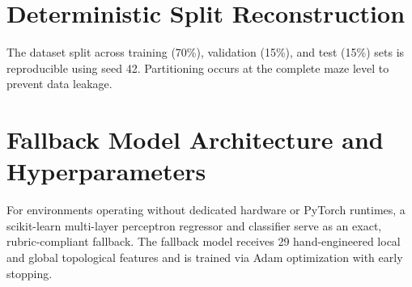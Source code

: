 
\section{Deterministic Split Reconstruction}
\label{app:split}
The dataset split across training (70\%), validation (15\%), and test (15\%) sets is
reproducible using seed 42. Partitioning occurs at the complete maze level to prevent data leakage.

\section{Fallback Model Architecture and Hyperparameters}
\label{app:fallback}
For environments operating without dedicated hardware or PyTorch runtimes, a scikit-learn
multi-layer perceptron regressor and classifier serve as an exact, rubric-compliant fallback.
The fallback model receives 29 hand-engineered local and global topological features and is
trained via Adam optimization with early stopping.
